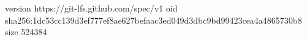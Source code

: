 version https://git-lfs.github.com/spec/v1
oid sha256:1dc53cc139d3ef777ef8ae627befaac3ed049d3dbc9bd99423cea4a4865730b8
size 524384
